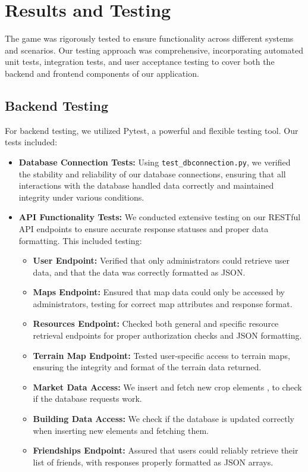 \documentclass[12pt]{article}
\begin{document}
\section{Results and Testing}
The game was rigorously tested to ensure functionality across different systems and scenarios. Our testing approach was comprehensive, incorporating automated unit tests, integration tests, and user acceptance testing to cover both the backend and frontend components of our application.
\subsection{Backend Testing}
For backend testing, we utilized Pytest, a powerful and flexible testing tool. Our tests included:
\begin{itemize}
    \item \textbf{Database Connection Tests:} Using \texttt{test\_dbconnection.py}, we verified the stability and reliability of our database connections, ensuring that all interactions with the database handled data correctly and maintained integrity under various conditions.
    \item \textbf{API Functionality Tests:} We conducted extensive testing on our RESTful API endpoints to ensure accurate response statuses and proper data formatting. This included testing:
        \begin{itemize}
            \item \textbf{User Endpoint:} Verified that only administrators could retrieve user data, and that the data was correctly formatted as JSON.
            \item \textbf{Maps Endpoint:} Ensured that map data could only be accessed by administrators, testing for correct map attributes and response format.
            \item \textbf{Resources Endpoint:} Checked both general and specific resource retrieval endpoints for proper authorization checks and JSON formatting.
            \item \textbf{Terrain Map Endpoint:} Tested user-specific access to terrain maps, ensuring the integrity and format of the terrain data returned.
            \item \textbf{Market Data Access:} We insert and fetch new crop elements , to check if the database requests work.
            \item \textbf{Building Data Access:} We check if the database is updated correctly when inserting new elements and fetching them.
            \item \textbf{Friendships Endpoint:} Assured that users could reliably retrieve their list of friends, with responses properly formatted as JSON arrays.

\end{itemize}
\end{itemize}
\end{document}
